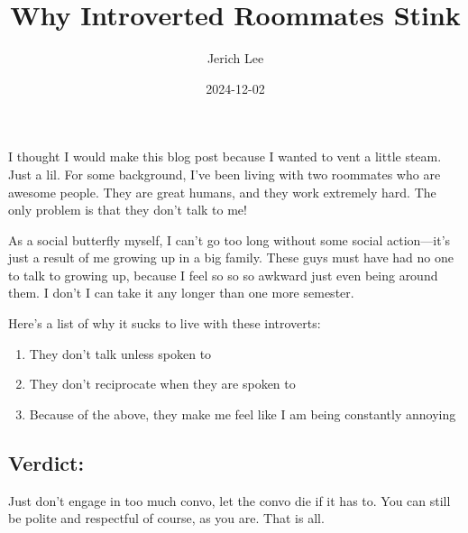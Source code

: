 \documentclass[12pt]{article}
\title{Why Introverted Roommates Stink}
\author{Jerich Lee}
\date{2024-12-02}
\theoremstyle{definition} %
\theoremstyle{plain} %
\begin{document}
\maketitle
I thought I would make this blog post because I wanted to vent a little steam. Just a lil. For some background, I've been living 
with two roommates who are awesome people. They are great humans, and they work extremely hard. The only problem is that they don't talk to me!
\vspace{.5cm} 

As a social butterfly myself, I can't go too long without some social action—it's just a result of me growing up in a big family. 
These guys must have had no one to talk to growing up, because I feel so so so awkward just even being around them. I don't I can take it any longer than one more semester.
\vspace{.5cm} 

Here's a list of why it sucks to live with these introverts:
\begin{enumerate}
    \item They don't talk unless spoken to
    \item They don't reciprocate when they are spoken to
    \item Because of the above, they make me feel like I am being constantly annoying
\end{enumerate}
\subsection{Verdict:}
Just don't engage in too much convo, let the convo die if it has to. You can still be polite and respectful of course, as you are. That is all.
\end{document}
